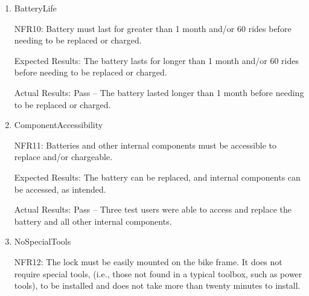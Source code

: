 \documentclass[12pt, titlepage]{article}
\begin{document}
\begin{enumerate}
{NFR9: Opening and closing lock must require similar force to a typical keyed/combo.  }

Expected Results: The amount of force required to open and close the lock frame is comparable to that of a typical keyed or combination lock. Test users score the force required out of 5 where 5 is the maximum amount of force they can physically provide and 1 is the minimum amount of force they can physically provide. The SmartLock should not vary more than 1 score unit from the most different score in each test. 

Actual Results: Three tests subjects’ results for the amount of force required to open and close the lock frame for the SmartLock, a typical keyed lock and a combination lock respectively out of 5: 

1- 2, 1, 2 

2- 3, 3, 3 

3- 1, 1, 2 

Therefore, the SmartLock did not vary more than one score unit from the most different score in each test. 

\item{BatteryLife

NFR10: Battery must last for greater than 1 month and/or 60 rides before needing to be replaced or charged.  }

Expected Results: The battery lasts for longer than 1 month and/or 60 rides before needing to be replaced or charged. 

Actual Results: Pass -- The battery lasted longer than 1 month before needing to be replaced or charged. 

\item{ComponentAccessibility

NFR11: Batteries and other internal components must be accessible to replace and/or chargeable. }

Expected Results: The battery can be replaced, and internal components can be accessed, as intended.

Actual Results: Pass -- Three test users were able to access and replace the battery and all other internal components.  

\item{NoSpecialTools

NFR12: The lock must be easily mounted on the bike frame. It does not require special tools, (i.e., those not found in a typical toolbox, such as power tools), to be installed and does not take more than twenty minutes to install. }


\end{enumerate}
\end{document}
